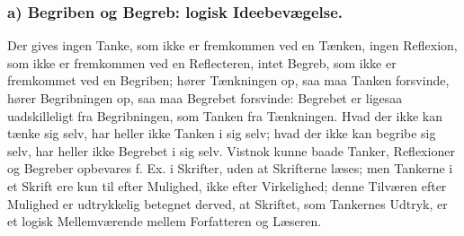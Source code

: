 \documentclass[11pt]{book}
\begin{document}
\subsubsection*{a) Begriben og Begreb: logisk Ideebevægelse.}
Der gives ingen Tanke, som ikke er fremkommen ved en Tænken, ingen
Reflexion, som ikke er fremkommen ved en Reflecteren, intet Begreb, som
ikke er fremkommet ved en Begriben; hører Tænkningen op, saa maa Tanken
forsvinde, hører Begribningen op, saa maa Begrebet forsvinde: Begrebet er
ligesaa uadskilleligt fra Begribningen, som Tanken fra Tænkningen. Hvad
der ikke kan tænke sig selv, har heller ikke Tanken i sig selv; hvad der
ikke kan begribe sig selv, har heller ikke Begrebet i sig selv. Vistnok
kunne baade Tanker, Reflexioner og Begreber opbevares f. Ex. i Skrifter,
uden at Skrifterne læses; men Tankerne i et Skrift ere kun til efter
Mulighed, ikke efter Virkelighed; denne Tilværen efter Mulighed er
udtrykkelig betegnet derved, at Skriftet, som Tankernes Udtryk, er et
logisk Mellemværende mellem Forfatteren og Læseren.
\end{document}
